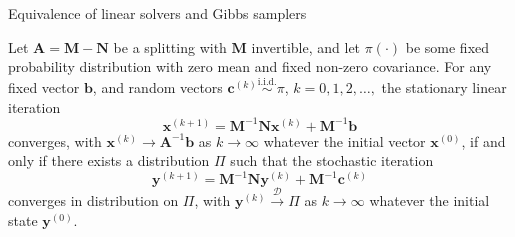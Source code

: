 \documentclass[10pt]{beamer}
\begin{document}
\begin{frame}{Equivalence of linear solvers and Gibbs samplers}
    \begin{theorem} %
        Let $\mathbf{A} = \mathbf{M} - \mathbf{N}$ be a splitting with $\mathbf{M}$ invertible, and let
        $\pi(\cdot)$ be some fixed probability distribution with zero mean and fixed non-zero covariance.
        For any fixed vector $\mathbf{b}$, and random vectors 
        $\mathbf{c}^{(k)} \overset{\text{i.i.d.}}{\sim} \pi$, $k = 0, 1, 2, \dots,$ 
        the stationary linear iteration
        \begin{equation}
            \mathbf{x}^{(k+1)} = \mathbf{M}^{-1}\mathbf{N}\mathbf{x}^{(k)} + \mathbf{M}^{-1}\mathbf{b}
        \end{equation}
        converges, with $\mathbf{x}^{(k)} \to \mathbf{A}^{-1}\mathbf{b}$ as $k \to \infty$ whatever
        the initial vector $\mathbf{x}^{(0)}$, if and only if there exists a distribution $\Pi$ such that
        the stochastic iteration
       \begin{equation}
            \mathbf{y}^{(k+1)} = \mathbf{M}^{-1}\mathbf{N}\mathbf{y}^{(k)} + \mathbf{M}^{-1}\mathbf{c}^{(k)}
        \end{equation}
        converges in distribution on $\Pi$, with $\mathbf{y}^{(k)} \overset{\mathcal{D}}{\to} \Pi$ as
        $k \to \infty$ whatever the initial state $\mathbf{y}^{(0)}$.
    \end{theorem}
\end{frame}
\end{document}
